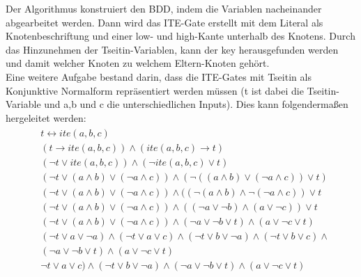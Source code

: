 \documentclass[a4,abstract=on]{scrartcl}
\begin{document}
Der Algorithmus konstruiert den BDD, indem die Variablen nacheinander abgearbeitet werden. Dann wird das ITE-Gate erstellt mit dem Literal als Knotenbeschriftung und einer low- und high-Kante unterhalb des Knotens. Durch das Hinzunehmen der Tseitin-Variablen, kann der key herausgefunden werden und damit welcher Knoten zu welchem Eltern-Knoten gehört.\\
Eine weitere Aufgabe bestand darin, dass die ITE-Gates mit Tseitin als Konjunktive Normalform repräsentiert werden müssen (t ist dabei die Tseitin-Variable und a,b und c die unterschiedlichen Inputs). Dies kann folgendermaßen hergeleitet werden:\\
\begin{align*}
\begin{aligned}
&t \leftrightarrow ite(a,b,c)\\
&(t \rightarrow ite (a,b,c)) \wedge (ite (a,b,c) \rightarrow t)\\
&(\neg t \vee ite(a,b,c)) \wedge (\neg ite(a,b,c) \vee t)\\
&(\neg t \vee (a \wedge b) \vee (\neg a \wedge c)) \wedge (\neg((a \wedge b) \vee (\neg a \wedge c)) \vee t)\\
&(\neg t \vee (a \wedge b) \vee (\neg a \wedge c)) \wedge ((\neg(a \wedge b) \wedge \neg (\neg a \wedge c)) \vee t\\
&(\neg t \vee (a \wedge b) \vee (\neg a \wedge c)) \wedge ((\neg a \vee \neg b) \wedge (a \vee \neg c)) \vee t\\
&(\neg t \vee (a \wedge b) \vee (\neg a \wedge c)) \wedge (\neg a \vee \neg b \vee t) \wedge (a \vee \neg c \vee t)\\
&(\neg t \vee a \vee \neg a) \wedge (\neg t \vee a\vee c) \wedge (\neg t \vee b \vee \neg a) \wedge (\neg t \vee b \vee c) \wedge \\
&(\neg a \vee \neg b \vee t) \wedge (a \vee \neg c \vee t)\\
&\neg t \vee a\vee c) \wedge (\neg t \vee b \vee \neg a) \wedge (\neg a \vee \neg b \vee t) \wedge (a \vee \neg c \vee t)
\end{aligned}
\end{align*}

\end{document}
